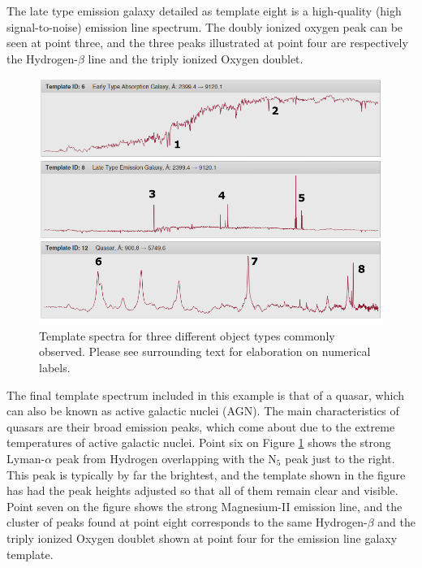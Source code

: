 \documentclass[titlesmallcaps, examinerscopy, copyrightpage]{uqthesis}
\begin{document}
The late type emission galaxy detailed as template eight is a high-quality (high signal-to-noise) emission line spectrum. The doubly ionized oxygen peak can be seen at point three, and the three peaks illustrated at point four are respectively the Hydrogen-$\beta$ line and the triply ionized Oxygen doublet.

\begin{figure}[ht!]
\includegraphics[width=1\textwidth]{images/types.png} 
\centering
\caption{Template spectra for three different object types commonly observed. Please see surrounding text for elaboration on numerical labels.}
\label{fig:types}
\end{figure}

The final template spectrum included in this example is that of a quasar, which can also be known as active galactic nuclei (AGN). The main characteristics of quasars are their broad emission peaks, which come about due to the extreme temperatures of active galactic nuclei. Point six on Figure \ref{fig:types} shows the strong Lyman-$\alpha$ peak from Hydrogen overlapping with the N$_5$ peak just to the right. This peak is typically by far the brightest, and the template shown in the figure has had the peak heights adjusted so that all of them remain clear and visible. Point seven on the figure shows the strong Magnesium-II emission line, and the cluster of peaks found at point eight corresponds to the same Hydrogen-$\beta$ and the triply ionized Oxygen doublet shown at point four for the emission line galaxy template.
\end{document}
